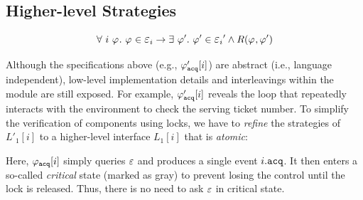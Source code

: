 \subsection{Higher-level Strategies}


$$\forall \ i \ \strat{} .\ \strat{} \in \oracle_{i} \rightarrow \exists \ \strat{}' . \ \strat{}' \in \oracle_{i}' \wedge R(\strat{}, \strat{}')$$


 Although the specifications above (e.g., $\varphi_{{\mathrm{\texttt{acq}}}}'[i]$) are abstract (i.e., language independent),
low-level implementation details and interleavings within the module are still exposed.
For example, $\varphi_{{\mathrm{\texttt{acq}}}}'[i]$ reveals the loop that repeatedly interacts with the environment to check the serving ticket number.
To simplify the verification of components using locks, we have to \emph{refine} the strategies of $L'_1[i]$ to a higher-level interface $L_1[i]$ that is \emph{atomic}:%
\begin{center}
\end{center}
Here, $\varphi_{{\mathrm{\texttt{acq}}}}[i]$ simply queries $\oracle$
and produces a single event $i.{\mathrm{\texttt{acq}}}$. It then enters  a so-called
\emph{critical} state (marked as gray) to prevent losing the control until  the lock is released. Thus, there is no need to  ask $\oracle$ in critical state. 


